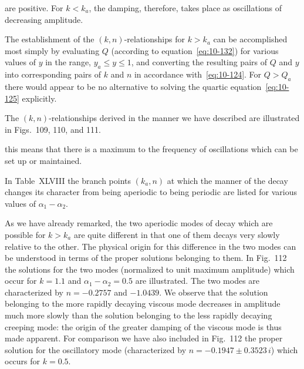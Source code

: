 are positive. For $k < k_a$, the damping, therefore, takes place as oscillations of decreasing amplitude.

The establishment of the $(k,n)$-relationships for $k > k_a$ can be accomplished most simply by evaluating $Q$ (according to equation~\eqref{eq:10-132}) for various values of $y$ in the range, $y_a \leqslant y \leqslant 1$, and converting the resulting pairs of $Q$ and $y$ into corresponding pairs of $k$ and $n$ in accordance with~\eqref{eq:10-124}. For $Q > Q_a$ there would appear to be no alternative to solving the quartic equation~\eqref{eq:10-125} explicitly.

The $(k,n)$-relationships derived in the manner we have described are illustrated in Figs.~109, 110, and 111.



this means that there is a maximum to the frequency of oscillations which can be set up or maintained.

In Table~XLVIII the branch points $(k_a, n)$ at which the manner of the decay changes its character from being aperiodic to being periodic are listed for various values of $\alpha_1-\alpha_2$.

As we have already remarked, the two aperiodic modes of decay which are possible for $k > k_a$ are quite different in that one of them decays very slowly relative to the other. The physical origin for this difference in the two modes can be understood in terms of the proper solutions belonging to them. In Fig.~112 the solutions for the two modes (normalized to unit maximum amplitude) which occur for $k = 1.1$ and $\alpha_1-\alpha_2 = 0.5$ are illustrated. The two modes are characterized by $n = -0.2757$ and $-1.0439$. We observe that the solution belonging to the more rapidly decaying viscous mode decreases in amplitude much more slowly than the solution belonging to the less rapidly decaying creeping mode: the origin of the greater damping of the viscous mode is thus made apparent. For comparison we have also included in Fig.~112 the proper solution for the oscillatory mode (characterized by $n = -0.1947 \pm 0.3523\,i$) which occurs for $k = 0.5$.

